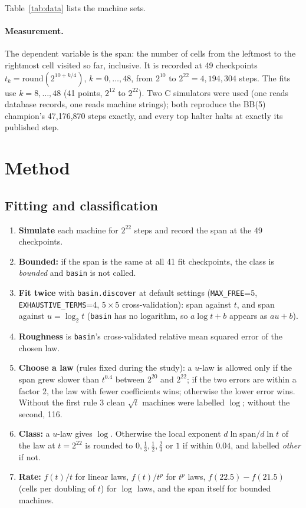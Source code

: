 \documentclass[11pt,a4paper]{article}
\newcommand{\BB}[1]{BB(#1)}
\begin{document}
Table~\ref{tab:data} lists the machine sets.

\paragraph{Measurement.} The dependent variable is the span: the number of cells from the leftmost
to the rightmost cell visited so far, inclusive. It is recorded at 49 checkpoints
$t_k = \mathrm{round}(2^{10 + k/4})$, $k = 0,\dots,48$, from $2^{10}$ to $2^{22} = 4{,}194{,}304$
steps. The fits use $k = 8,\dots,48$ (41 points, $2^{12}$ to $2^{22}$). Two C simulators were
used (one reads database records, one reads machine strings); both reproduce the \BB{5}
champion's 47,176,870 steps exactly, and every top halter halts at exactly its published step.

\section{Method}
\label{sec:pipeline}

\subsection{Fitting and classification}
\begin{enumerate}
\item \textbf{Simulate} each machine for $2^{22}$ steps and record the span at the 49 checkpoints.
\item \textbf{Bounded:} if the span is the same at all 41 fit checkpoints, the class is
\emph{bounded} and \texttt{basin} is not called.
\item \textbf{Fit twice} with \texttt{basin.discover} at default settings (\texttt{MAX\_FREE}=5,
\texttt{EXHAUSTIVE\_TERMS}=4, $5{\times}5$ cross-validation): span against $t$, and span against
$u = \log_2 t$ (\texttt{basin} has no logarithm, so $a\log t + b$ appears as $au+b$).
\item \textbf{Roughness} is \texttt{basin}'s cross-validated relative mean squared error of the
chosen law.
\item \textbf{Choose a law} (rules fixed during the study):
a $u$-law is allowed only if the span grew slower than $t^{0.4}$ between $2^{20}$ and $2^{22}$;
if the two errors are within a factor 2, the law with fewer coefficients wins; otherwise the
lower error wins. Without the first rule 3 clean $\sqrt t$ machines were labelled $\log$; without
the second, 116.
\item \textbf{Class:} a $u$-law gives $\log$. Otherwise the local exponent
$d\ln \mathrm{span}/d\ln t$ of the law at $t = 2^{22}$ is rounded to $0, \tfrac13, \tfrac12,
\tfrac23$ or $1$ if within $0.04$, and labelled \emph{other} if not.
\item \textbf{Rate:} $f(t)/t$ for linear laws, $f(t)/t^p$ for $t^p$ laws, $f(22.5)-f(21.5)$ (cells
per doubling of $t$) for $\log$ laws, and the span itself for bounded machines.
\end{enumerate}
\end{document}

